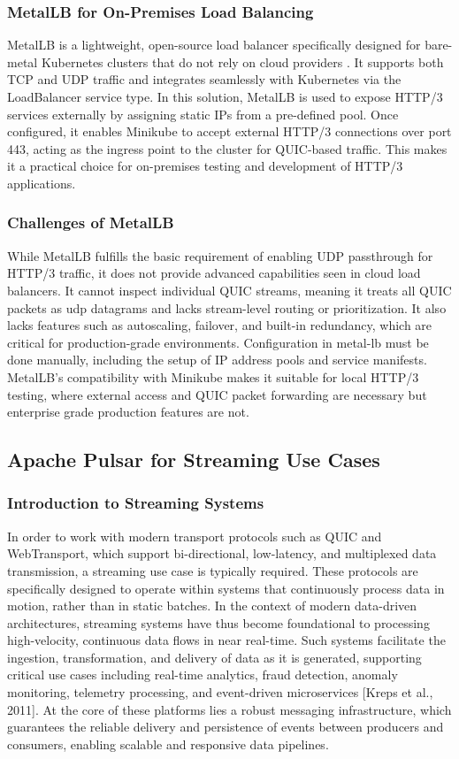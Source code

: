 \subsubsection{MetalLB for On-Premises Load Balancing}
MetalLB is a lightweight, open-source load balancer specifically designed for bare-metal Kubernetes clusters that do not rely on cloud providers \cite{metallb-docs}. It supports both TCP and UDP traffic and integrates seamlessly with Kubernetes via the LoadBalancer service type. In this solution, MetalLB is used to expose HTTP/3 services externally by assigning static IPs from a pre-defined pool. Once configured, it enables Minikube to accept external HTTP/3 connections over port 443, acting as the ingress point to the cluster for QUIC-based traffic. This makes it a practical choice for on-premises testing and development of HTTP/3 applications.

\subsubsection{Challenges of MetalLB}
While MetalLB fulfills the basic requirement of enabling UDP passthrough for HTTP/3 traffic, it does not provide advanced capabilities seen in cloud load balancers. It cannot inspect individual QUIC streams, meaning it treats all QUIC packets as udp datagrams and lacks stream-level routing or prioritization. It also lacks features such as autoscaling, failover, and built-in redundancy, which are critical for production-grade environments. Configuration in metal-lb must be done manually, including the setup of IP address pools and service manifests. MetalLB's compatibility with Minikube makes it suitable for local HTTP/3 testing, where external access and QUIC packet forwarding are necessary but enterprise grade production features are not.

\subsection{Apache Pulsar for Streaming Use Cases}
\subsubsection{Introduction to Streaming Systems}
In order to work with modern transport protocols such as QUIC and WebTransport, which support bi-directional, low-latency, and multiplexed data transmission, a streaming use case is typically required. These protocols are specifically designed to operate within systems that continuously process data in motion, rather than in static batches. In the context of modern data-driven architectures, streaming systems have thus become foundational to processing high-velocity, continuous data flows in near real-time. Such systems facilitate the ingestion, transformation, and delivery of data as it is generated, supporting critical use cases including real-time analytics, fraud detection, anomaly monitoring, telemetry processing, and event-driven microservices [Kreps et al., 2011]. At the core of these platforms lies a robust messaging infrastructure, which guarantees the reliable delivery and persistence of events between producers and consumers, enabling scalable and responsive data pipelines.

